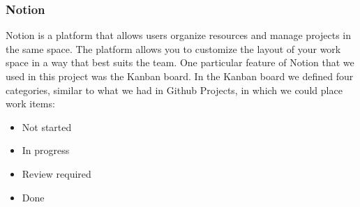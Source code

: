 

\subsubsection{Notion}
Notion is a platform that allows users organize resources and manage projects in the same space. The platform allows you to customize the layout of your work space in a way that best suits the team. One particular feature of Notion that we used in this project was the Kanban board. In the Kanban board we defined four categories, similar to what we had in Github Projects, in which we could place work items:

\begin{itemize}
    \item Not started
    \item In progress
    \item Review required
    \item Done
\end{itemize}

